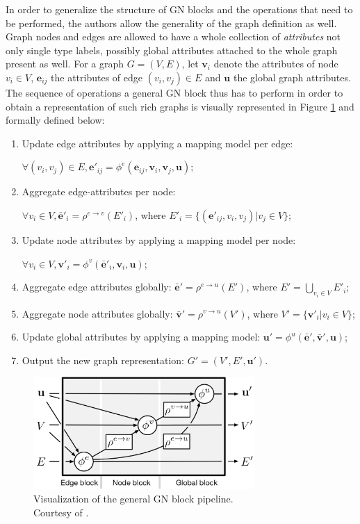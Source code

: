 In order to generalize the structure of GN blocks and the operations that need to be performed, the authors allow the generality of the graph definition as well. Graph nodes and edges are allowed to have a whole collection of \emph{attributes} not only single type labels, possibly global attributes attached to the whole graph present as well. For a graph $G=(V, E)$, let $\pmb{v}_i$ denote the attributes of node $v_i \in V$, $\pmb{e}_{ij}$ the attributes of edge $(v_i,v_j)\in E$ and $\pmb{u}$ the global graph attributes. The sequence of operations a general GN block thus has to perform in order to obtain a representation of such rich graphs is visually represented in Figure \ref{fig:general_gn_block} and formally defined below:
\begin{enumerate}
\item Update edge attributes by applying a mapping model per edge: 

$\forall (v_i, v_j) \in E, \pmb{e}'_{ij} = \phi^e(\pmb{e}_{ij},\pmb{v}_i,\pmb{v}_j,\pmb{u})$;
\item Aggregate edge-attributes per node: 

$\forall v_i \in V,\bar{\pmb{e}}'_i = \rho^{e \to v}(E'_i)$, where $E'_i = \{(\pmb{e}'_{ij}, v_i, v_j)| v_j \in V\}$;
\item Update node attributes by applying a mapping model per node: 

$\forall v_i \in V, \pmb{v}'_i = \phi^v(\bar{\pmb{e}}'_i, \pmb{v}_i, \pmb{u})$;
\item Aggregate edge attributes globally: $\bar{\pmb{e}}'=\rho^{e \to u}(E')$, where $E' = \bigcup_{v_i \in V}{E'_i}$;
\item Aggregate node attributes globally: $\bar{\pmb{v}}'=\rho^{v \to u}(V')$, where $V' = \{\pmb{v}'_i| v_i \in V\}$;
\item Update global attributes by applying a mapping model: $\pmb{u}'=\phi^u(\bar{\pmb{e}}', \bar{\pmb{v}}', \pmb{u})$;
\item Output the new graph representation: $G'=(V', E', \pmb{u}')$.
\end{enumerate}

\begin{figure}[H]
\centering
\includegraphics[width=0.75\textwidth]{figures/background/general_gn_block}
\caption[Visualization of the general GN block pipeline.]{Visualization of the general GN block pipeline. \\Courtesy of \cite{battaglia_relational_2018}.}
\label{fig:general_gn_block}
\end{figure}

